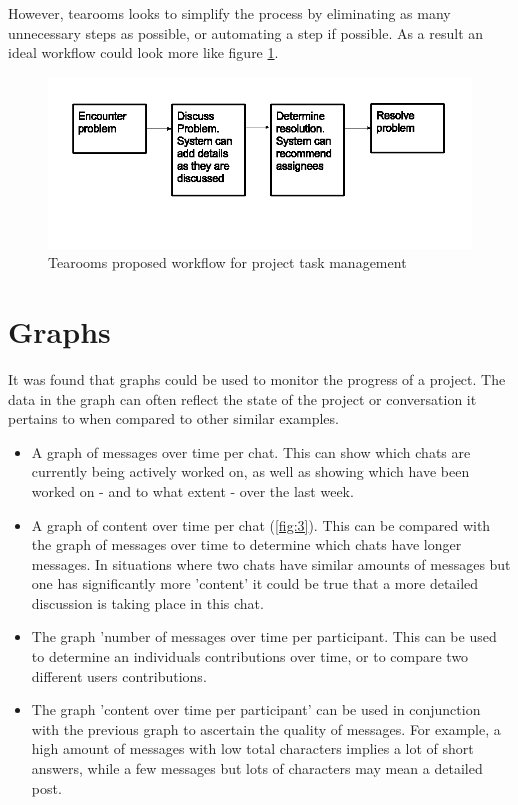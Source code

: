 \documentclass{l4proj}
\begin{document}
However, tearooms looks to simplify the process by eliminating as many unnecessary steps as possible, or automating a step if possible.  As a result an ideal workflow could look more like figure \ref{fig:2}. 

\begin{figure}[h]
\includegraphics[scale=0.75]{New-workflow.png}
\centering
\caption{Tearooms proposed workflow for project task management}
\label{fig:2}
\end{figure}

\section{Graphs}

It was found that graphs could be used to monitor the progress of a project. The data in the graph can often reflect the state of the project or conversation it pertains to when compared to other similar examples.

\begin{itemize}
\item A graph of messages over time per chat.  This can show which chats are currently being actively worked on, as well as showing which have been worked on - and to what extent - over the last week.
\item A graph of content over time per chat (\ref{fig:3}).  This can be compared with the graph of messages over time to determine which chats have longer messages.  In situations where two chats have similar amounts of messages but one has significantly more 'content' it could be true that a more detailed discussion is taking place in this chat.
\item The graph 'number of messages over time per participant.  This can be used to determine an individuals contributions over time, or to compare two different users contributions.
\item The graph 'content over time per participant' can be used in conjunction with the previous graph to ascertain the quality of messages.  For example, a high amount of messages with low total characters implies a lot of short answers, while a few messages but lots of characters may mean a detailed post.
\end{itemize}
\end{document}
